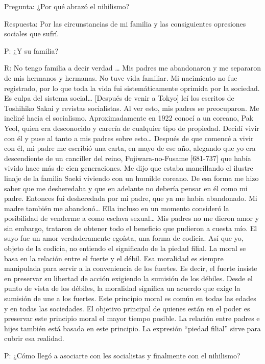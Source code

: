 \documentclass[
]{book}
\begin{document}
Pregunta: ¿Por qué abrazó el nihilismo?

Respuesta: Por las circunstancias de mi familia y las consiguientes opresiones sociales que sufrí.

P: ¿Y su familia?

R: No tengo familia a decir verdad \ldots{} Mis padres me abandonaron y me separaron de mis hermanos y hermanas. No tuve vida familiar. Mi nacimiento no fue registrado, por lo que toda la vida fui sistemáticamente oprimida por la sociedad. Es culpa del sistema social\ldots{} {[}Después de venir a Tokyo{]} leí los escritos de Toshihiko Sakai y revistas socialistas. Al ver esto, mis padres se preocuparon. Me incliné hacia el socialismo. Aproximadamente en 1922 conocí a un coreano, Pak Yeol, quien era desconocido y carecía de cualquier tipo de propiedad. Decidí vivir con él y puse al tanto a mis padres sobre esto\ldots{} Después de que comencé a vivir con él, mi padre me escribió una carta, en mayo de ese año, alegando que yo era descendiente de un canciller del reino, Fujiwara-no-Fusame {[}681-737{]} que había vivido hace más de cien generaciones. Me dijo que estaba mancillando el ilustre linaje de la familia Saeki viviendo con un humilde coreano. De esa forma me hizo saber que me desheredaba y que en adelante no debería pensar en él como mi padre. Entonces fui desheredada por mi padre, que ya me había abandonado. Mi madre también me abandonó\ldots{} Ella incluso en un momento consideró la posibilidad de venderme a como esclava sexual\ldots{} Mis padres no me dieron amor y sin embargo, trataron de obtener todo el beneficio que pudieron a cuesta mío. El suyo fue un amor verdaderamente egoísta, una forma de codicia. Así que yo, objeto de la codicia, no entiendo el significado de la piedad filial. La moral se basa en la relación entre el fuerte y el débil. Esa moralidad es siempre manipulada para servir a la conveniencia de los fuertes. Es decir, el fuerte insiste en preservar su libertad de acción exigiendo la sumisión de los débiles. Desde el punto de vista de los débiles, la moralidad significa un acuerdo que exige la sumisión de une a los fuertes. Este principio moral es común en todas las edades y en todas las sociedades. El objetivo principal de quienes están en el poder es preservar este principio moral el mayor tiempo posible. La relación entre padres e hijes también está basada en este principio. La expresión ``piedad filial'' sirve para cubrir esa realidad.

P: ¿Cómo llegó a asociarte con les socialistas y finalmente con el nihilismo?
\end{document}
